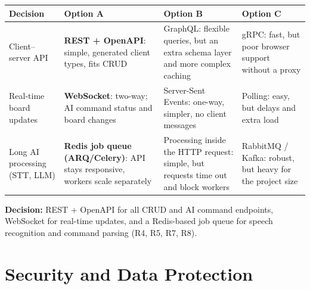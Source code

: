 \documentclass[11pt,a4paper]{article}
\newcommand{\tblstart}{\small\rowcolors{2}{gray!7}{white}}
\begin{document}
{\tblstart
\begin{xltabular}{\textwidth}{P{3.2cm} L L L}
\toprule
\textbf{Decision} & \textbf{Option A} & \textbf{Option B} & \textbf{Option C} \\
\midrule
\endhead
Client--server API & \textbf{REST + OpenAPI}: simple, generated client types, fits CRUD & GraphQL: flexible queries, but an extra schema layer and more complex caching & gRPC: fast, but poor browser support without a proxy \\
Real-time board updates & \textbf{WebSocket}: two-way; AI command status and board changes & Server-Sent Events: one-way, simpler, no client messages & Polling: easy, but delays and extra load \\
Long AI processing (STT, LLM) & \textbf{Redis job queue (ARQ/Celery)}: API stays responsive, workers scale separately & Processing inside the HTTP request: simple, but requests time out and block workers & RabbitMQ / Kafka: robust, but heavy for the project size \\
\bottomrule
\end{xltabular}}

\textbf{Decision:} REST + OpenAPI for all CRUD and AI command endpoints, WebSocket for real-time updates, and a Redis-based job queue for speech recognition and command parsing (R4, R5, R7, R8).

\section{Security and Data Protection}
\end{document}
